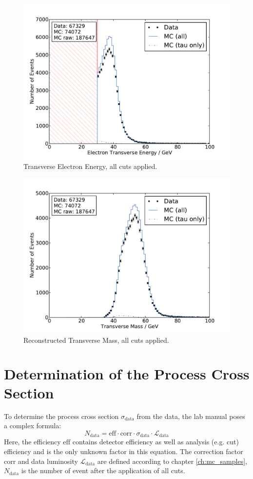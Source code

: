 \documentclass[
	paper=A4,
	parskip=full,
	chapterprefix=true,
	11pt,
	headings=normal,
	bibliography=totoc,
	listof=totoc,
	titlepage=on,
]{scrreprt}
\begin{document}
\begin{figure}%
	\centering
	\includegraphics{allcuts/E_T_el}
	\caption{Transverse Electron Energy, all cuts applied.}
	\label{fig:cuts_Et}
\end{figure}
\begin{figure}
	\centering
	\includegraphics{allcuts/m_T}
	\caption{Reconstructed Transverse Mass, all cuts applied.}
	\label{fig:cuts_Mt}
\end{figure}

\chapter{Determination of the Process Cross Section}
To determine the process cross section $\sigma_\mathrm{data}$ from the data, the lab manual poses a complex formula:
\begin{equation}
	N_\mathrm{data} = \mathrm{eff} \cdot \mathrm{corr} \cdot \sigma_\mathrm{data} \cdot \mathcal{L}_\mathrm{data}
	\label{eq:data_xsec}
\end{equation}
Here, the efficiency $\mathrm{eff}$ contains detector efficiency as well as analysis (e.g. cut) efficiency and is the only unknown factor in this equation. The correction factor $\mathrm{corr}$ and data luminosity $\mathcal{L}_\mathrm{data}$ are defined according to chapter \ref{ch:mc_samples}, $N_\mathrm{data}$ is the number of event after the application of all cuts.
\end{document}

